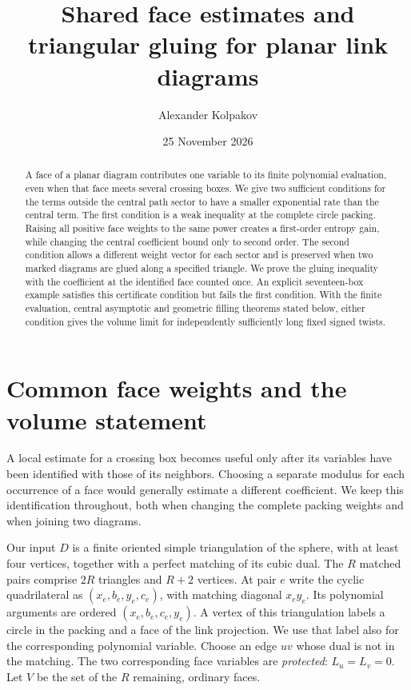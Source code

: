 \documentclass[11pt]{article}
\title{Shared face estimates and triangular gluing for planar link diagrams}
\author{Alexander Kolpakov}\date{25 November 2026}
\numberwithin{equation}{section}
\theoremstyle{definition}\newtheorem{definition}[theorem]{Definition}
\theoremstyle{remark}\newtheorem{remark}[theorem]{Remark}
\begin{document}
\maketitle
\begin{abstract}
A face of a planar diagram contributes one variable to its finite
polynomial evaluation, even when that face meets several crossing boxes.
We give two sufficient conditions for the terms outside the central
path sector to have a smaller exponential rate than the central term.
The first condition is a weak inequality at the complete circle packing.
Raising all positive face weights to the same power creates a first-order
entropy gain, while changing the central coefficient bound only to
second order. The second condition allows a different weight vector
for each sector and is preserved when two marked diagrams are glued
along a specified triangle. We prove the gluing inequality with the
coefficient at the identified face counted once. An explicit
seventeen-box example satisfies this certificate condition but fails
the first condition. With the finite evaluation, central asymptotic and
geometric filling theorems stated below, either condition gives the
volume limit for independently sufficiently long fixed signed twists.
\end{abstract}

\section{Common face weights and the volume statement}

A local estimate for a crossing box becomes useful only after its
variables have been identified with those of its neighbors. Choosing
a separate modulus for each occurrence of a face would generally
estimate a different coefficient. We keep this identification
throughout, both when changing the complete packing weights and when
joining two diagrams.

Our input \(D\) is a finite oriented simple triangulation of the sphere,
with at least four vertices, together with a perfect matching of its
cubic dual. The \(R\) matched pairs comprise \(2R\) triangles and
\(R+2\) vertices. At pair \(e\) write the cyclic quadrilateral as
\((x_e,b_e,y_e,c_e)\), with matching diagonal \(x_ey_e\).
Its polynomial arguments are ordered \((x_e,b_e,c_e,y_e)\).
A vertex of this triangulation labels a circle in the packing and
a face of the link projection. We use that label also for the
corresponding polynomial variable. Choose an edge $uv$ whose dual
is not in the matching. The two corresponding face variables
are \emph{protected}: \(L_u=L_v=0\). Let \(V\) be the set of the
\(R\) remaining, ordinary faces.
\end{document}
